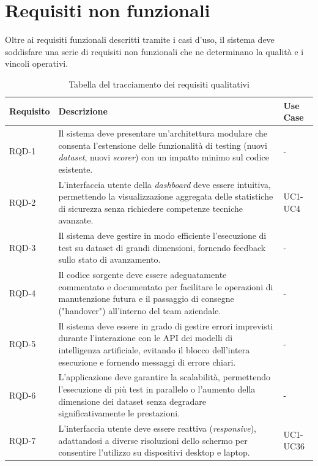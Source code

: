 \newpage

\section{Requisiti non funzionali}
Oltre ai requisiti funzionali descritti tramite i casi d'uso, il sistema deve soddisfare una serie di requisiti non funzionali che ne determinano la qualità e i vincoli operativi.

\begin{table}%
\caption{Tabella del tracciamento dei requisiti qualitativi}
\label{tab:requisiti-qualitativi}
\begin{tabularx}{\textwidth}{lXl}
\hline\hline
\textbf{Requisito} & \textbf{Descrizione} & \textbf{Use Case}\\
\hline
RQD-1    & Il sistema deve presentare un'architettura modulare che consenta l'estensione delle funzionalità di testing (nuovi \emph{dataset}, nuovi \emph{scorer}) con un impatto minimo sul codice esistente. & - \\
\hline
RQD-2    & L'interfaccia utente della \emph{dashboard} deve essere intuitiva, permettendo la visualizzazione aggregata delle statistiche di sicurezza senza richiedere competenze tecniche avanzate. & UC1-UC4 \\
\hline
RQD-3    & Il sistema deve gestire in modo efficiente l'esecuzione di test su dataset di grandi dimensioni, fornendo feedback sullo stato di avanzamento. & - \\
\hline
RQD-4    & Il codice sorgente deve essere adeguatamente commentato e documentato per facilitare le operazioni di manutenzione futura e il passaggio di consegne ("handover") all'interno del team aziendale. & - \\
\hline
RQD-5    & Il sistema deve essere in grado di gestire errori imprevisti durante l'interazione con le API dei modelli di intelligenza artificiale, evitando il blocco dell'intera esecuzione e fornendo messaggi di errore chiari. & - \\
\hline
RQD-6    & L'applicazione deve garantire la scalabilità, permettendo l'esecuzione di più test in parallelo o l'aumento della dimensione dei dataset senza degradare significativamente le prestazioni. & - \\
\hline
RQD-7    & L'interfaccia utente deve essere reattiva (\emph{responsive}), adattandosi a diverse risoluzioni dello schermo per consentire l'utilizzo su dispositivi desktop e laptop. & UC1-UC36 \\
\hline
\end{tabularx}
\end{table}%

